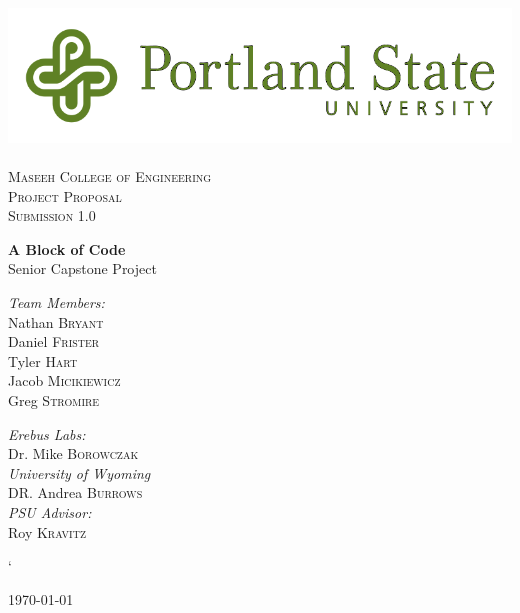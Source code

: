 
\usepackage{pstricks}
\linespread{1.1}

\begin{titlepage}
\begin{center}

\includegraphics[width=.75\textwidth]{./PSU_logo.png}~\\[.5cm]

\textsc{\LARGE \color{PSU} Maseeh College of Engineering}\\[1.5cm]

\textsc{\Large Project Proposal}\\[0.5cm]
\textsc{\Large Submission 1.0}\\[0.5cm]
\vspace{1cm}

{ \huge \bfseries\color{PSU} A Block of Code\\[0.4cm] }
  \large Senior Capstone Project

\vspace{2.5cm}
 \begin{multicols}{2}

\begin{flushleft}
\noindent
 \large
\emph{\color{PSU}Team Members:}\\
Nathan \textsc{Bryant}\\
Daniel \textsc{Frister}\\
Tyler  \textsc{Hart}\\
Jacob   \textsc{Micikiewicz}\\
Greg    \textsc{Stromire}\\
\end{flushleft}

 \begin{flushleft}
  \large
 \emph{\color{PSU}Erebus Labs:} \\
 Dr. Mike  \textsc{Borowczak}\\
 \emph{\color{PSU}University of Wyoming}\\
 DR. Andrea \textsc{Burrows}\\
 \emph{\color{PSU}PSU Advisor:}\\
 Roy \textsc{Kravitz}
 \end{flushleft}


 \end{multicols}`
\vfill

{\large \today}

\end{center}
\end{titlepage}
 \tableofcontents
 \vfill

